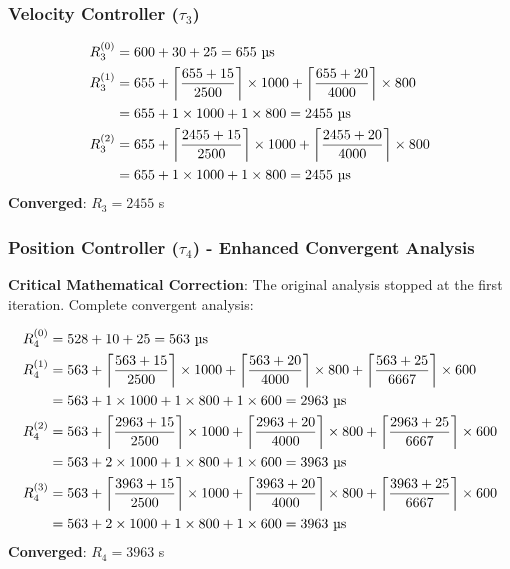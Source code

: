 \documentclass[11pt]{article}
\begin{document}
\subsubsection{Velocity Controller ($\tau_3$)}
\begin{align}
R_3^{(0)} &= 600 + 30 + 25 = 655 \text{ \textmu s}\\
R_3^{(1)} &= 655 + \left\lceil \frac{655 + 15}{2500} \right\rceil \times 1000 + \left\lceil \frac{655 + 20}{4000} \right\rceil \times 800\\
&= 655 + 1 \times 1000 + 1 \times 800 = 2455 \text{ \textmu s}\\
R_3^{(2)} &= 655 + \left\lceil \frac{2455 + 15}{2500} \right\rceil \times 1000 + \left\lceil \frac{2455 + 20}{4000} \right\rceil \times 800\\
&= 655 + 1 \times 1000 + 1 \times 800 = 2455 \text{ \textmu s}
\end{align}
\textbf{Converged}: $R_3 = 2455$ \textmu s

\subsubsection{Position Controller ($\tau_4$) - Enhanced Convergent Analysis}

\textbf{Critical Mathematical Correction}: The original analysis stopped at the first iteration. Complete convergent analysis:

\begin{align}
R_4^{(0)} &= 528 + 10 + 25 = 563 \text{ \textmu s}\\
R_4^{(1)} &= 563 + \left\lceil \frac{563 + 15}{2500} \right\rceil \times 1000 + \left\lceil \frac{563 + 20}{4000} \right\rceil \times 800 + \left\lceil \frac{563 + 25}{6667} \right\rceil \times 600\\
&= 563 + 1 \times 1000 + 1 \times 800 + 1 \times 600 = 2963 \text{ \textmu s}\\
R_4^{(2)} &= 563 + \left\lceil \frac{2963 + 15}{2500} \right\rceil \times 1000 + \left\lceil \frac{2963 + 20}{4000} \right\rceil \times 800 + \left\lceil \frac{2963 + 25}{6667} \right\rceil \times 600\\
&= 563 + 2 \times 1000 + 1 \times 800 + 1 \times 600 = 3963 \text{ \textmu s}\\
R_4^{(3)} &= 563 + \left\lceil \frac{3963 + 15}{2500} \right\rceil \times 1000 + \left\lceil \frac{3963 + 20}{4000} \right\rceil \times 800 + \left\lceil \frac{3963 + 25}{6667} \right\rceil \times 600\\
&= 563 + 2 \times 1000 + 1 \times 800 + 1 \times 600 = 3963 \text{ \textmu s}
\end{align}
\textbf{Converged}: $R_4 = 3963$ \textmu s
\end{document}
